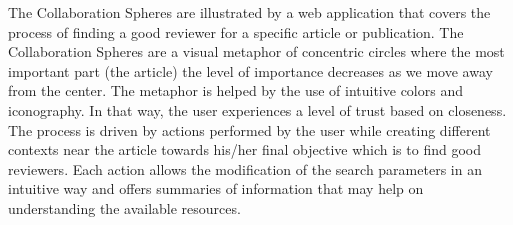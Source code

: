 The Collaboration Spheres are illustrated by a web application that covers the process
of finding a good reviewer for a specific article or publication. The Collaboration Spheres are a visual metaphor of concentric circles where the most important part (the article) the level of importance decreases as we move away from the center. The metaphor is helped by the use of intuitive colors and iconography. In that way, the user experiences a level of trust based on closeness. The process is driven by actions performed by the user while creating different contexts near the article towards his/her final objective which is to find good reviewers. Each action allows the modification of the search parameters in an intuitive way and offers summaries of information that may help on understanding the available resources.\\
